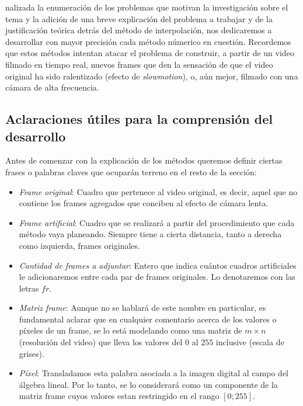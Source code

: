 
nalizada la enumeraci\'on de los problemas que motivan la investigaci\'on sobre el tema y la adici\'on de una breve explicaci\'on del problema a trabajar y de la justificación teórica detrás del método de interpolación, nos dedicaremos a desarrollar con mayor precisi\'on cada m\'etodo n\'umerico en cuesti\'on. Recordemos que estos métodos intentan atacar el problema de construir, a partir de un video filmado en tiempo real, nuevos frames que den la sensaci\'on de que el video original ha sido ralentizado (efecto de \emph{slowmotion}), o, aún mejor, filmado con una cámara de alta frecuencia.

\subsection{Aclaraciones \'utiles para la comprensi\'on del desarrollo}

Antes de comenzar con la explicaci\'on de los m\'etodos queremos definir ciertas frases o palabras claves que ocupar\'an terreno en el resto de la secci\'on:

\begin{itemize}
	\item \textit{Frame original}: Cuadro que pertenece al video original, es decir, aquel que no contiene los frames agregados que conciben al efecto de c\'amara lenta.
	\item \textit{Frame artificial}: Cuadro que se realizar\'a a partir del procedimiento que cada m\'etodo vaya planeando. Siempre tiene a cierta distancia, tanto a derecha como izquierda, frames originales.
	\item \textit{Cantidad de frames a adjuntar}: Entero que indica cu\'antos cuadros artificiales le adicionaremos entre cada par de frames originales. Lo denotaremos con las letras $fr$.
	\item \textit{Matriz frame}: Aunque no se hablar\'a de este nombre en particular, es fundamental aclarar que en cualquier comentario acerca de los valores o p\'ixeles de un frame, se lo est\'a modelando como una matriz de $m \times n$ (resoluci\'on del video) que lleva los valores del $0$ al $255$ inclusive (escala de grises).
    \item \textit{P\'ixel}: Transladamos esta palabra asociada a la imagen digital al campo del \'algebra lineal. Por lo tanto, se lo considerar\'a como un componente de la matriz frame cuyos valores estan restringido en el rango $[0;255]$.
\end{itemize}


